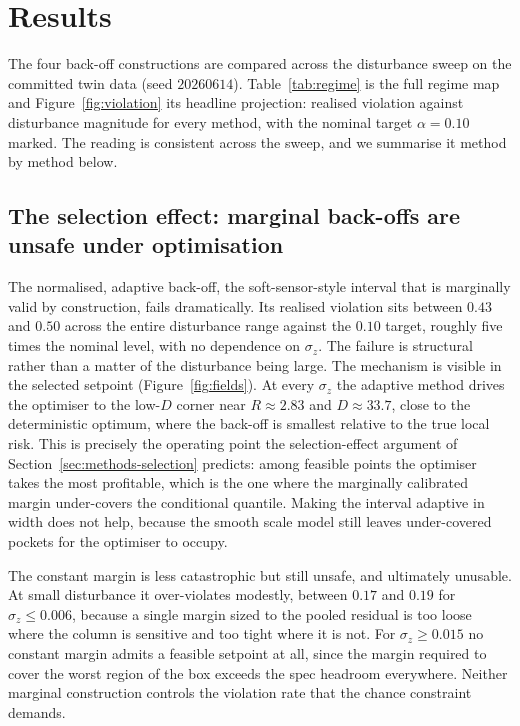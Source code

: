 \documentclass[review,times]{elsarticle}
\begin{document}
\section{Results}
\label{sec:results}

The four back-off constructions are compared across the disturbance sweep on the committed
twin data (seed $20260614$). Table~\ref{tab:regime} is the full regime map and
Figure~\ref{fig:violation} its headline projection: realised violation against disturbance
magnitude for every method, with the nominal target $\alpha=0.10$ marked. The reading is
consistent across the sweep, and we summarise it method by method below.

\subsection{The selection effect: marginal back-offs are unsafe under optimisation}
\label{sec:results-selection}

The normalised, adaptive back-off, the soft-sensor-style interval that is marginally valid by
construction, fails dramatically. Its realised violation sits between $0.43$ and $0.50$ across
the entire disturbance range against the $0.10$ target, roughly five times the nominal level,
with no dependence on $\sigma_z$. The failure is structural rather than a matter of the
disturbance being large. The mechanism is visible in the selected setpoint
(Figure~\ref{fig:fields}). At every $\sigma_z$ the adaptive method drives the optimiser to the
low-$D$ corner near $R\approx2.83$ and $D\approx33.7$, close to the deterministic optimum,
where the back-off is smallest relative to the true local risk. This is precisely the
operating point the selection-effect argument of Section~\ref{sec:methods-selection} predicts:
among feasible points the optimiser takes the most profitable, which is the one where the
marginally calibrated margin under-covers the conditional quantile. Making the interval
adaptive in width does not help, because the smooth scale model still leaves under-covered
pockets for the optimiser to occupy.

The constant margin is less catastrophic but still unsafe, and ultimately unusable. At small
disturbance it over-violates modestly, between $0.17$ and $0.19$ for $\sigma_z\le0.006$,
because a single margin sized to the pooled residual is too loose where the column is sensitive
and too tight where it is not. For $\sigma_z\ge0.015$ no constant margin admits a feasible
setpoint at all, since the margin required to cover the worst region of the box exceeds the
spec headroom everywhere. Neither marginal construction controls the violation rate that the
chance constraint demands.
\end{document}
